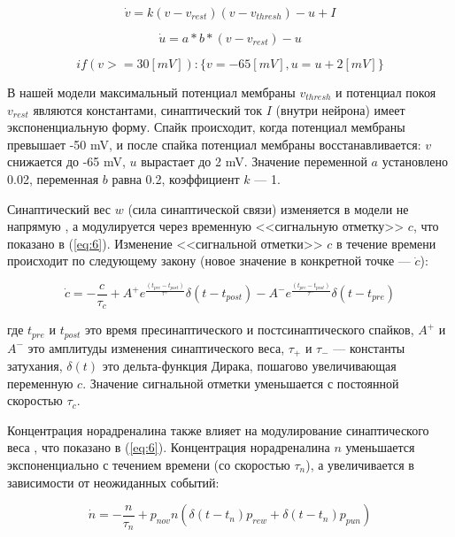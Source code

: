 \begin{equation} \label{eq:1}
\dot{v} = k (v - v_{rest})(v - v_{thresh}) - u + I
\end{equation}


\begin{equation} \label{eq:2}
\dot{u}=  a*b*(v - v_{rest}) - u
\end{equation}


\begin{equation}\label{eq:3}
if (v >= 30 [mV]) : \{v = - 65 [mV], u = u + 2 [mV]\}
\end{equation}


В нашей модели максимальный потенциал мембраны $v_{thresh}$ и потенциал покоя $v_{rest}$ являются константами, синаптический ток $I$ (внутри нейрона) имеет экспоненциальную форму. Спайк происходит, когда потенциал мембраны превышает -50 mV, и после спайка потенциал мембраны восстанавливается: $v$ снижается до -65 mV, $u$ вырастает до 2 mV. Значение переменной $a$ установлено 0.02, переменная $b$ равна 0.2, коэффициент $k$ --- 1.


Синаптический вес $w$ (сила синаптической связи) изменяется в модели не напрямую \cite{stdp}, а модулируется через временную <<сигнальную отметку>> $c$, что показано в (\ref{eq:6}). Изменение <<сигнальной отметки>> $c$ в течение времени происходит по следующему закону (новое значение в конкретной точке --- $\dot{c}$):


\begin{equation}\label{eq:4}
\dot{c} =  -\frac{c}{\tau_c} + A^+e^{\frac{(t_{pre} - t_{post})}{\tau^+}}\delta(t - t_{post})  -A^-e^{  \frac{(t_{pre} - t_{post})}{\tau^-}}\delta(t - t_{pre} )
\end{equation}


где $t_{pre}$ и $t_{post}$ это время пресинаптического и постсинаптического спайков, $A^+$ и $A^-$ это амплитуды изменения синаптического веса, $\tau_+$ и $\tau_-$ --- константы затухания, $\delta(t)$ это дельта-функция Дирака, пошагово увеличивающая переменную $c$. Значение сигнальной отметки уменьшается с постоянной скоростью $\tau_c$. 


Концентрация норадреналина также влияет на модулирование синаптического веса \cite{nora1}\cite{nora2}, что показано в (\ref{eq:6}). Концентрация норадреналина $n$ уменьшается экспоненциально с течением времени (со скоростью $\tau_n$), а увеличивается в зависимости от неожиданных событий:


\begin{equation}\label{eq:5}
\dot{n} = -\frac{n}{\tau_n} + p_{nov}n (\delta(t - t_n)p_{rew} + \delta(t - t_n)p_{pun})
\end{equation}



